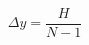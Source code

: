 \documentclass[preview,border=2pt]{standalone}
\begin{document}
\[
\Delta y=\frac{H}{N-1}
\]
\end{document}
